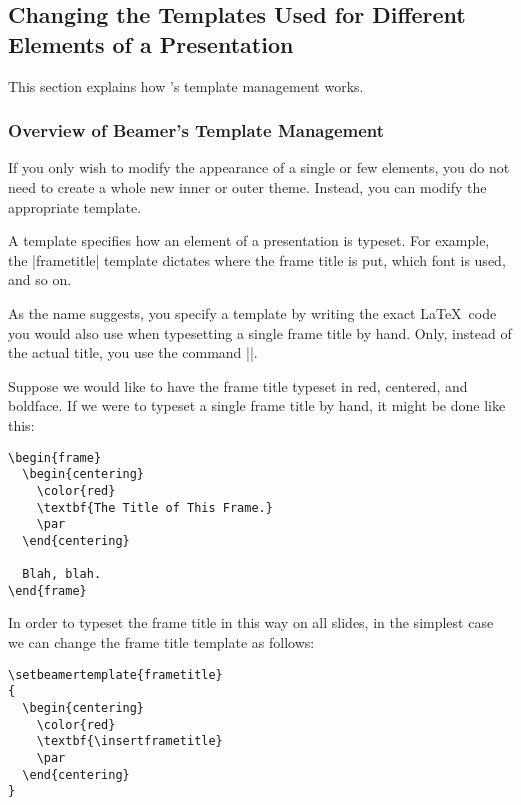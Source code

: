 \subsection{Changing the Templates Used for Different Elements of a Presentation}

\label{section-templates}

This section explains how \beamer's template management works.



\subsubsection{Overview of Beamer's Template Management}

If you only wish to modify the appearance of a single or few elements,
you do not need to create a whole new inner or outer theme. Instead,
you can modify the appropriate template. 

A template specifies how an element of a presentation is typeset. For 
example, the |frametitle| template dictates where the frame title is
put, which font is used, and so on.

As the name suggests, you specify a template by writing the exact
\LaTeX\ code you would also use when typesetting a single frame title
by hand. Only, instead of the actual title, you use the command
|\insertframetitle|.

\example
Suppose we would like to have the frame title typeset in
red, centered, and boldface. If we were to typeset a single frame
title by hand, it might be done like this:
\begin{verbatim}
\begin{frame}
  \begin{centering}
    \color{red}
    \textbf{The Title of This Frame.}
    \par
  \end{centering}

  Blah, blah.
\end{frame}
\end{verbatim}

In order to typeset the frame title in this way on all slides, in the
simplest case we can change the frame title template as follows:
\begin{verbatim}
\setbeamertemplate{frametitle}
{
  \begin{centering}
    \color{red}
    \textbf{\insertframetitle}
    \par
  \end{centering}
}
\end{verbatim}

